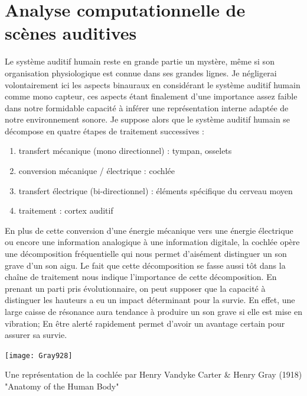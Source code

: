 
\section{\nmu Analyse computationnelle de scènes auditives} \label{sec:asa}

Le système auditif humain reste en grande partie un mystère, même si son organisation physiologique est connue dans ses grandes lignes. Je négligerai volontairement ici les aspects binauraux en considérant le système auditif humain comme mono capteur, ces aspects étant finalement d'une importance assez faible dans notre formidable capacité à inférer une représentation interne adaptée de notre environnement sonore. Je suppose alors que le système auditif humain se décompose en quatre étapes de traitement successives :
\begin{enumerate}
  \item transfert mécanique (mono directionnel) : tympan, osselets
  \item conversion mécanique / électrique : cochlée
  \item transfert électrique (bi-directionnel) : éléments spécifique du cerveau moyen
  \item traitement : cortex auditif
\end{enumerate}

En plus de cette conversion d'une énergie mécanique vers une énergie électrique ou encore une information analogique à une information digitale, la cochlée opère une décomposition fréquentielle qui nous permet d'aisément distinguer un son grave d'un son aigu. Le fait que cette décomposition se fasse aussi tôt dans la chaîne de traitement nous indique l'importance de cette décomposition. En prenant un parti pris évolutionnaire, on peut supposer que la capacité à distinguer les hauteurs a eu un impact déterminant pour la survie. En effet, une large caisse de résonance aura tendance à produire un son grave si elle est mise en vibration; En être alerté rapidement permet d'avoir un avantage certain pour assurer sa survie.

\begin{marginfigure}
  \texttt{[image: Gray928]}
  \caption{Une représentation de la cochlée par Henry Vandyke Carter \& Henry Gray (1918) "Anatomy of the Human Body"} %
\end{marginfigure}

